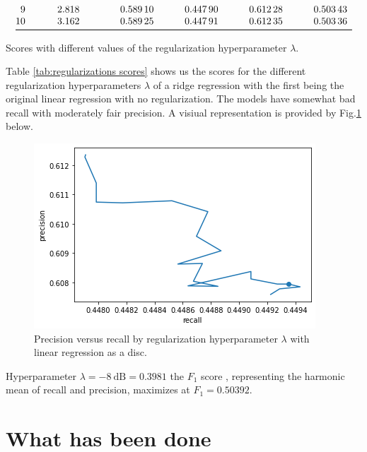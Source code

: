 \documentclass[11pt]{report}
\begin{document}
\begin{table}[]
\[\begin{array}{@{}SS[round-mode=figures,round-precision=4]l*4{S[round-mode=figures,round-precision=5,group-separator={\,}]}}
            9 & 2.8183829312644537
                && 0.5891
                & 0.44790445258763506
                & 0.6122752617389601
                & 0.5034322630651811
        \\*
            10 & 3.1622776601683795
                && 0.58925
                & 0.4479094003626063
                & 0.6123493532783794
                & 0.5033598847989803
        \\*
        \bottomrule
        \end{array}
    \]
    \caption{Scores with different values of the regularization hyperparameter \(\lambda\).}
    \label{tab:regularizations scores}
\end{table}

Table \ref{tab:regularizations scores} shows us
the scores for the different regularization hyperparameters \(\lambda\) of a ridge regression
with the first being the original linear regression with no regularization. The models have somewhat bad recall with moderately fair precision. A visiual representation is provided by Fig.\ref{fig:precision vs recall}  below.

\begin{figure}
    \centering
    \includegraphics[width=0.75\linewidth]{ipynb/output_67_0.png}
    \caption{Precision versus recall by regularization hyperparameter \(\lambda\) with linear regression as a disc.}
    \label{fig:precision vs recall}
\end{figure}

Hyperparameter
\(\lambda = \SI{-8}{\deci\bel} = 0.3981\)
the \(F_1\) score%
, representing the harmonic mean of recall and precision,
maximizes at \(F_1 = \num[group-separator={\,}]{0.50392}\).

\section{What has been done}
\end{document}
